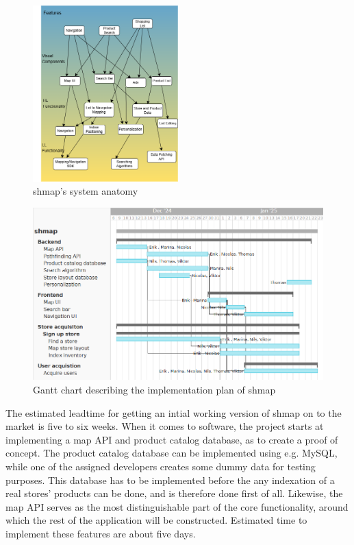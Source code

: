 \documentclass[titlepage]{article}
\def\companyName{shmap}
\begin{document}
\begin{figure}[h]
    \centering
    \includegraphics[width=0.5\textwidth]{SystemAnatomy.png}
    \caption{\companyName's system anatomy}
    \label{fig:sysanat}
\end{figure}

\begin{figure}[h]
    \centering
    \includegraphics[width=1\textwidth]{implementation_plan.png}
    \caption{Gantt chart describing the implementation plan of \companyName}
    \label{fig:ganttchart}
\end{figure}

The estimated leadtime for getting an intial working version of shmap on to the market is five to six weeks. When it comes to software, the project starts at implementing a map API and product catalog database, as to create a proof of concept. The product catalog database can be implemented using e.g. MySQL, while one of the assigned developers creates some dummy data for testing purposes. This database has to be implemented before the any indexation of a real stores' products can be done, and is therefore done first of all. Likewise, the map API serves as the most distinguishable part of the core functionality, around which the rest of the application will be constructed. Estimated time to implement these features are about five days.
\end{document}

